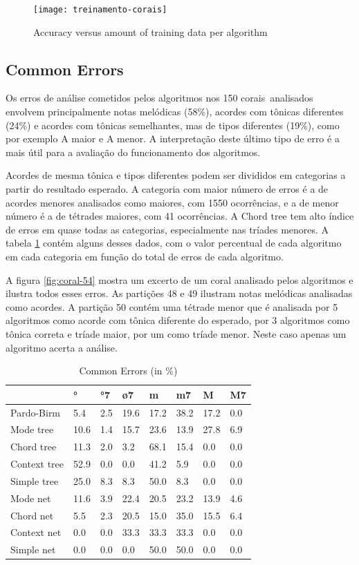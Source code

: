 \documentclass{article}
\begin{document}
\begin{figure}
  \texttt{[image: treinamento-corais]}
  \caption{Accuracy versus amount of training data per algorithm}
  \label{fig:treinamento-corais}
\end{figure}


\subsection{Common Errors}
\label{sec:common-errors}


Os erros de análise cometidos pelos algoritmos nos 150 corais\
analisados envolvem principalmente notas melódicas (58\%), acordes com
tônicas diferentes (24\%) e acordes com tônicas semelhantes, mas de
tipos diferentes (19\%), como por exemplo A maior e A menor. A
interpretação deste último tipo de erro é a mais útil para a avaliação
do funcionamento dos algoritmos.

Acordes de mesma tônica e tipos diferentes podem ser divididos em
categorias a partir do resultado esperado. A categoria com maior
número de erros é a de acordes menores analisados como maiores, com
1550 ocorrências, e a de menor número é a de tétrades maiores, com 41
ocorrências. A Chord tree tem alto índice de erros em quase todas as
categorias, especialmente nas tríades menores. A tabela
\ref{tab:common-errors} contém alguns desses dados, com o valor
percentual de cada algoritmo em cada categoria em função do total de
erros de cada algoritmo.

A figura \ref{fig:coral-54} mostra um excerto de um coral analisado
pelos algoritmos e ilustra todos esses erros. As partições 48 e 49
ilustram notas melódicas analisadas como acordes. A partição 50 contém
uma tétrade menor que é analisada por 5 algoritmos como acorde com
tônica diferente do esperado, por 3 algoritmos como tônica correta e
tríade maior, por um como tríade menor. Neste caso apenas um algoritmo
acerta a análise.

\begin{table}
  \centering
  \begin{tabular}{l|lllllll}
                 &   °&  °7&  ø7&   m&  m7&   M&  M7\\
    \hline
    Pardo-Birm   & 5.4& 2.5&19.6&17.2&38.2&17.2& 0.0\\
    Mode tree    &10.6& 1.4&15.7&23.6&13.9&27.8& 6.9\\
    Chord tree   &11.3& 2.0& 3.2&68.1&15.4& 0.0& 0.0\\
    Context tree &52.9& 0.0& 0.0&41.2& 5.9& 0.0& 0.0\\
    Simple tree  &25.0& 8.3& 8.3&50.0& 8.3& 0.0& 0.0\\
    Mode net     &11.6& 3.9&22.4&20.5&23.2&13.9& 4.6\\
    Chord net    & 5.5& 2.3&20.5&15.0&35.0&15.5& 6.4\\
    Context net  & 0.0& 0.0&33.3&33.3&33.3& 0.0& 0.0\\
    Simple net   & 0.0& 0.0& 0.0&50.0&50.0& 0.0& 0.0\\
  \end{tabular}
  \caption{Common Errors (in \%)}
  \label{tab:common-errors}
\end{table}
\end{document}
